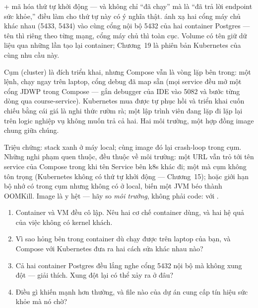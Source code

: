 + mã hóa thứ tự khởi động --- và không chỉ ``đã chạy'' mà
là ``đã trả lời endpoint sức khỏe,'' điều làm cho thứ tự này có ý nghĩa
thật.  ánh xạ hai cổng máy chủ khác nhau (5433, 5434) vào cùng
cổng nội bộ 5432 của hai container Postgres --- tên thì riêng theo từng
mạng, cổng máy chủ thì toàn cục. Volume có tên giữ dữ liệu qua những
lần tạo lại container; Chương~19 là phiên bản Kubernetes của cùng nhu
cầu này.

\begin{decision}
Cụm (cluster) là đích triển khai, nhưng Compose vẫn là vòng lặp bên
trong: một lệnh, chạy ngay trên laptop, cổng debug đã map sẵn (mọi
service đều mở một cổng JDWP trong Compose --- gắn debugger của IDE vào
5082 và bước từng dòng qua course-service). Kubernetes mua được tự phục
hồi và triển khai cuốn chiếu bằng cái giá là nghi thức rườm rà; một lập
trình viên đang lặp đi lặp lại trên logic nghiệp vụ không muốn trả cả
hai. Hai môi trường, một hợp đồng image chung giữa chúng.
\end{decision}

\begin{pitfall}
Triệu chứng: stack xanh ở máy local; cùng image đó lại crash-loop trong
cụm. Những nghi phạm quen thuộc, đều thuộc về môi trường: một URL vẫn
trỏ tới tên service của Compose trong khi tên Service bên k8s khác đi;
một  mà cụm không tôn trọng (Kubernetes không có thứ
tự khởi động --- Chương~15); hoặc giới hạn bộ nhớ có trong cụm nhưng
không có ở local, biến một JVM béo thành OOMKill. Image là y hệt --- hãy
so \emph{môi trường}, không phải code:  với
.
\end{pitfall}

\begin{quiz}
\begin{enumerate}
  \item Container và VM đều cô lập. Nêu hai cơ chế container dùng, và
  hai hệ quả của việc không có kernel khách.
  \item Vì sao  hỏng bên trong container dù chạy
  được trên laptop của bạn, và Compose với Kubernetes đưa ra hai cách
  sửa khác nhau nào?
  \item Cả hai container Postgres đều lắng nghe cổng 5432 nội bộ mà
  không xung đột --- giải thích. Xung đột lại có thể xảy ra ở đâu?
  \item Điều gì khiến  mạnh hơn
   thường, và file nào của dự án cung cấp tín hiệu
  sức khỏe mà nó chờ?
\end{enumerate}
\end{quiz}
